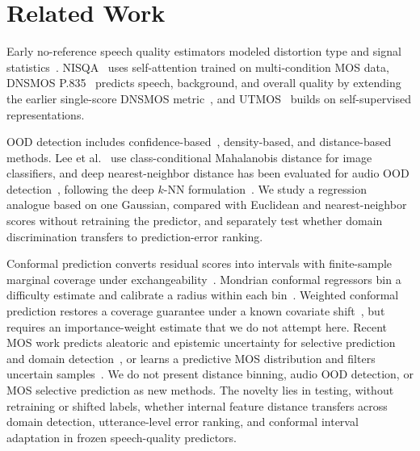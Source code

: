 \vspace{-.2cm}
\section{Related Work}
\label{sec:related}

Early no-reference speech quality estimators modeled distortion type and signal statistics~\cite{ITUTP563}. NISQA~\cite{Mittag2021nisqa} uses self-attention trained on multi-condition MOS data, DNSMOS P.835~\cite{Reddy2022dnsmos} predicts speech, background, and overall quality by extending the earlier single-score DNSMOS metric~\cite{Reddy2021dnsmos}, and UTMOS~\cite{Saeki2022utmos} builds on self-supervised representations.

OOD detection includes confidence-based~\cite{Hendrycks2017}, density-based, and distance-based methods. Lee et al.~\cite{Lee2018} use class-conditional Mahalanobis distance for image classifiers, and deep nearest-neighbor distance has been evaluated for audio OOD detection~\cite{Bukhsh2023AudioKNN}, following the deep $k$-NN formulation~\cite{Sun2022}. We study a regression analogue based on one Gaussian, compared with Euclidean and nearest-neighbor scores without retraining the predictor, and separately test whether domain discrimination transfers to prediction-error ranking.

Conformal prediction converts residual scores into intervals with finite-sample marginal coverage under exchangeability~\cite{Vovk2005,Angelopoulos2023conformal,Papadopoulos2002}. Mondrian conformal regressors bin a difficulty estimate and calibrate a radius within each bin~\cite{Bostrom2020Mondrian}. Weighted conformal prediction restores a coverage guarantee under a known covariate shift~\cite{Tibshirani2019}, but requires an importance-weight estimate that we do not attempt here. Recent MOS work predicts aleatoric and epistemic uncertainty for selective prediction and domain detection~\cite{Wang2024UncertaintyMOS}, or learns a predictive MOS distribution and filters uncertain samples~\cite{Hoq2025FuseMOS}. We do not present distance binning, audio OOD detection, or MOS selective prediction as new methods. The novelty lies in testing, without retraining or shifted labels, whether internal feature distance transfers across domain detection, utterance-level error ranking, and conformal interval adaptation in frozen speech-quality predictors.
